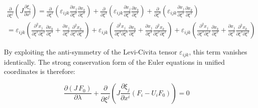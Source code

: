 \[\begin{array}{l}
\frac{\partial }{{\partial {\xi ^j}}}\left( {J\frac{{\partial {\xi _j}}}{{\partial {x^i}}}} \right) = \frac{\partial }{{\partial {\xi ^1}}}\left( {{\varepsilon _{ijk}}\frac{{\partial {x_j}}}{{\partial {\xi ^2}}}\frac{{\partial {x_k}}}{{\partial {\xi ^3}}}} \right) + \frac{\partial }{{\partial {\xi ^2}}}\left( {{\varepsilon _{ijk}}\frac{{\partial {x_j}}}{{\partial {\xi ^3}}}\frac{{\partial {x_k}}}{{\partial {\xi ^1}}}} \right) + \frac{\partial }{{\partial {\xi ^3}}}\left( {{\varepsilon _{ijk}}\frac{{\partial {x_j}}}{{\partial {\xi ^1}}}\frac{{\partial {x_k}}}{{\partial {\xi ^2}}}} \right)\\
 = {\varepsilon _{ijk}}\left( {\frac{{{\partial ^2}{x_j}}}{{\partial {\xi ^1}\partial {\xi ^2}}}\frac{{\partial {x_k}}}{{\partial {\xi ^3}}} + \frac{{\partial {x_j}}}{{\partial {\xi ^2}}}\frac{{{\partial ^2}{x_k}}}{{\partial {\xi ^1}\partial {\xi ^3}}}} \right) + {\varepsilon _{ijk}}\left( {\frac{{{\partial ^2}{x_j}}}{{\partial {\xi ^2}\partial {\xi ^3}}}\frac{{\partial {x_k}}}{{\partial {\xi ^1}}} + \frac{{\partial {x_j}}}{{\partial {\xi ^3}}}\frac{{{\partial ^2}{x_k}}}{{\partial {\xi ^2}\partial {\xi ^1}}}} \right) + {\varepsilon _{ijk}}\left( {\frac{{{\partial ^2}{x_j}}}{{\partial {\xi ^3}\partial {\xi ^1}}}\frac{{\partial {x_k}}}{{\partial {\xi ^2}}} + \frac{{\partial {x_j}}}{{\partial {\xi ^1}}}\frac{{{\partial ^2}{x_k}}}{{\partial {\xi ^3}\partial {\xi ^2}}}} \right)
\end{array}\]

By exploiting the anti-symmetry of the Levi-Civita tensor $\varepsilon_{ijk}$, this term vanishes identically. The strong conservation form of the Euler equations in unified coordinates is therefore:

\begin{equation}
\label{eq:UCS-Euler-UCS-strong}
\frac{{\partial \left( {J\,{F_0}} \right)}}{{\partial \lambda}} + \frac{\partial }{{\partial {\xi ^j}}}\left( {J\frac{{\partial {\xi _j}}}{{\partial {x^i}}}\left( {{F_i} - {U_i}{F_0}} \right)} \right)=0
\end{equation}

